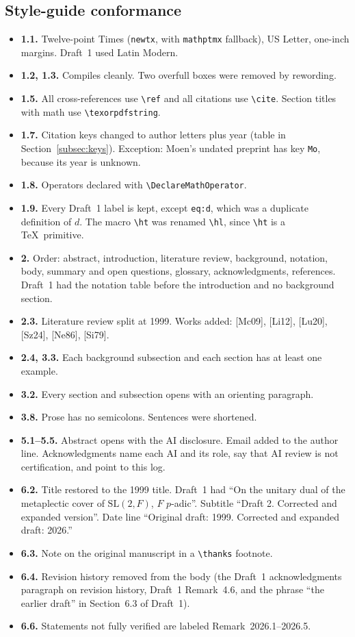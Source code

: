 \documentclass[12pt,letterpaper]{article}
\newcommand{\hl}{\tilde h}
\begin{document}
\subsection{Style-guide conformance}
\begin{itemize}[leftmargin=*]
\item \textbf{1.1.} Twelve-point Times (\texttt{newtx}, with
  \texttt{mathptmx} fallback), US Letter, one-inch margins. Draft~1 used
  Latin Modern.
\item \textbf{1.2, 1.3.} Compiles cleanly. Two overfull boxes were
  removed by rewording.
\item \textbf{1.5.} All cross-references use \verb|\ref| and all
  citations use \verb|\cite|. Section titles with math use
  \verb|\texorpdfstring|.
\item \textbf{1.7.} Citation keys changed to author letters plus year
  (table in Section~\ref{subsec:keys}). Exception: Moen's undated
  preprint has key \texttt{Mo}, because its year is unknown.
\item \textbf{1.8.} Operators declared with \verb|\DeclareMathOperator|.
\item \textbf{1.9.} Every Draft~1 label is kept, except
  \texttt{eq:d}, which was a duplicate definition of $d$. The macro
  \verb|\ht| was renamed \verb|\hl|, since \verb|\ht| is a \TeX\
  primitive.
\item \textbf{2.} Order: abstract, introduction, literature review,
  background, notation, body, summary and open questions, glossary,
  acknowledgments, references. Draft~1 had the notation table before
  the introduction and no background section.
\item \textbf{2.3.} Literature review split at 1999. Works added:
  [Mc09], [Li12], [Lu20], [Sz24], [Ne86], [Si79].
\item \textbf{2.4, 3.3.} Each background subsection and each section
  has at least one example.
\item \textbf{3.2.} Every section and subsection opens with an
  orienting paragraph.
\item \textbf{3.8.} Prose has no semicolons. Sentences were shortened.
\item \textbf{5.1--5.5.} Abstract opens with the AI disclosure. Email
  added to the author line. Acknowledgments name each AI and its role,
  say that AI review is not certification, and point to this log.
\item \textbf{6.2.} Title restored to the 1999 title. Draft~1 had
  ``On the unitary dual of the metaplectic cover of $\mathrm{SL}(2,F)$,
  $F$ $p$-adic''. Subtitle ``Draft 2. Corrected and expanded version''.
  Date line ``Original draft: 1999. Corrected and expanded draft:
  2026.''
\item \textbf{6.3.} Note on the original manuscript in a
  \verb|\thanks| footnote.
\item \textbf{6.4.} Revision history removed from the body (the
  Draft~1 acknowledgments paragraph on revision history, Draft~1
  Remark~4.6, and the phrase ``the earlier draft'' in Section~6.3 of
  Draft~1).
\item \textbf{6.6.} Statements not fully verified are labeled
  Remark~2026.1--2026.5.
\end{itemize}
\end{document}
